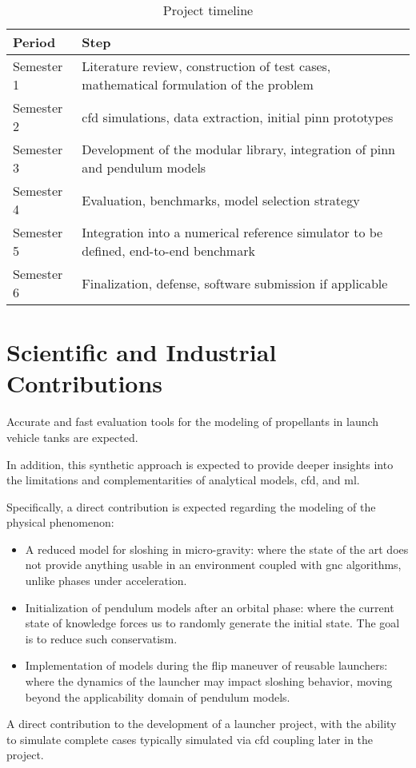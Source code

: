 \documentclass[12pt]{article}
\begin{document}
	\begin{table}[h]
		\centering
		\begin{tabularx}{\textwidth}{l X}
			
			\hline
			
			Period & Step \\
			
			\hline
			
			Semester 1 & Literature review, construction of test cases, mathematical formulation of the problem \\
			Semester 2 & \acrshort{cfd} simulations, data extraction, initial \acrshort{pinn} prototypes \\
			Semester 3 & Development of the modular library, integration of \acrshort{pinn} and pendulum models \\
			Semester 4 & Evaluation, benchmarks, model selection strategy \\
			Semester 5 & Integration into a numerical reference simulator to be defined, end-to-end benchmark \\
			Semester 6 & Finalization, defense, software submission if applicable \\
			
			\hline
			
		\end{tabularx}
		\caption{Project timeline}
	\end{table}	
	
	\section*{Scientific and Industrial Contributions}
	
	Accurate and fast evaluation tools for the modeling of propellants in launch vehicle tanks are expected.
	
	In addition, this synthetic approach is expected to provide deeper insights into the limitations and complementarities of analytical models, \acrshort{cfd}, and \acrlong{ml}.
	
	Specifically, a direct contribution is expected regarding the modeling of the physical phenomenon:
	\begin{itemize}
		\item A reduced model for sloshing in micro-gravity: where the state of the art does not provide anything usable in an environment coupled with \acrshort{gnc} algorithms, unlike phases under acceleration.
		\item Initialization of pendulum models after an orbital phase: where the current state of knowledge forces us to randomly generate the initial state. The goal is to reduce such conservatism.
		\item Implementation of models during the flip maneuver of reusable launchers: where the dynamics of the launcher may impact sloshing behavior, moving beyond the applicability domain of pendulum models.
	\end{itemize}
	A direct contribution to the development of a launcher project, with the ability to simulate complete cases typically simulated via \acrshort{cfd} coupling later in the project.
	
\end{document}
